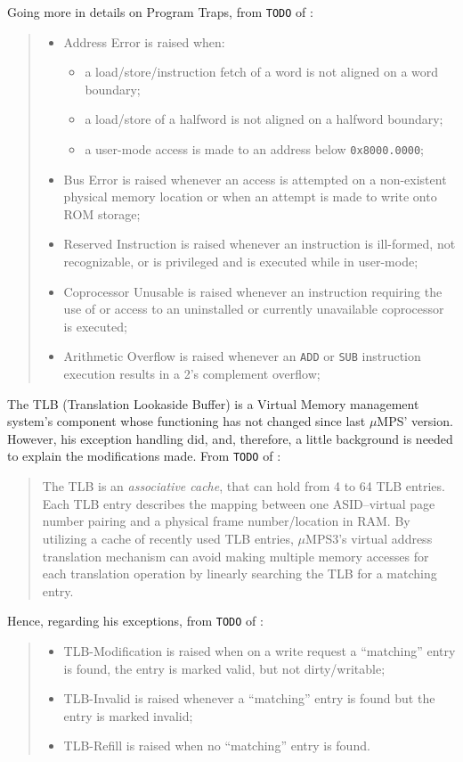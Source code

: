 \documentclass[12pt,a4paper,openright,twoside]{report}
\begin{document}
Going more in details on Program Traps, from \texttt{TODO} of \cite{pops}:
\begin{quote}
	\begin{itemize}
		\item Address Error is raised when:
		      \begin{itemize}
			      \item a load/store/instruction fetch of a word is not aligned on a word boundary;
			      \item a load/store of a halfword is not aligned on a halfword boundary;
			      \item a user-mode access is made to an address below \texttt{0x8000.0000};
		      \end{itemize}
		\item Bus Error is raised whenever an access is attempted on a non-existent physical memory location or when an attempt is made to write onto ROM storage;
		\item Reserved Instruction is raised whenever an instruction is ill-formed, not recognizable, or is privileged and is executed while in user-mode;
		\item Coprocessor Unusable is raised whenever an instruction requiring the use of or access to an uninstalled or currently unavailable coprocessor is executed;
		\item Arithmetic Overflow is raised whenever an \texttt{ADD} or \texttt{SUB} instruction execution results in a 2's complement overflow;
	\end{itemize}
\end{quote}

The TLB (Translation Lookaside Buffer) is a Virtual Memory management system's component whose functioning has not changed since last $\mu$MPS' version.
However, his exception handling did, and, therefore, a little background is needed to explain the modifications made. From \texttt{TODO} of \cite{pops}:
\begin{quote}
	The TLB is an \textit{associative cache}, that can hold from 4 to 64 TLB entries.
	Each TLB entry describes the mapping between one ASID–virtual page number pairing and a physical frame number/location in RAM.
	By utilizing a cache of recently used TLB entries, $\mu$MPS3's virtual address translation mechanism can avoid making multiple memory accesses for each translation operation by linearly searching the TLB for a matching entry.
\end{quote}

Hence, regarding his exceptions, from \texttt{TODO} of \cite{pops}:
\begin{quote}
	\begin{itemize}
		\item TLB-Modification is raised when on a write request a ``matching'' entry is found, the entry is marked valid, but not dirty/writable;
		\item TLB-Invalid is raised whenever a ``matching'' entry is found but the entry is marked invalid;
		\item TLB-Refill is raised when no ``matching'' entry is found.
	\end{itemize}
\end{quote}
\end{document}
